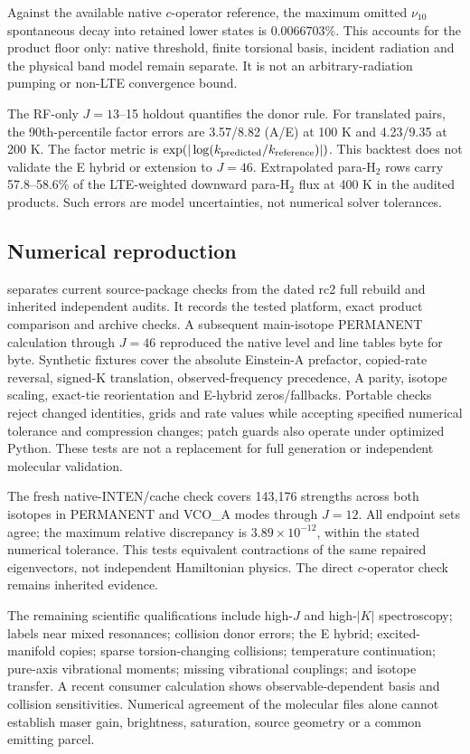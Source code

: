\documentclass[11pt,a4paper]{article}
\begin{document}
Against the available native $c$-operator reference, the maximum omitted
$\nu_{10}$ spontaneous decay into retained lower states is
$0.0066703\%$. This accounts for the product floor only: native threshold,
finite torsional basis, incident radiation and the physical band model remain
separate. It is not an arbitrary-radiation pumping or non-LTE convergence bound.

The RF-only $J=13$--15 holdout quantifies the donor rule. For translated
pairs, the 90th-percentile factor errors are 3.57/8.82 (A/E) at 100 K and
4.23/9.35 at 200 K. The factor metric is
$\exp(|\log(k_{\rm predicted}/k_{\rm reference})|)$.
This backtest does not validate the E hybrid or extension to $J=46$.
Extrapolated para-H$_2$ rows carry 57.8--58.6\% of the LTE-weighted downward
para-H$_2$ flux at 400 K in the audited products. Such errors are model
uncertainties, not numerical solver tolerances.

\subsection{Numerical reproduction}
 separates current source-package checks from
the dated rc2 full rebuild and inherited independent audits. It records the
tested platform, exact product comparison and archive checks. A subsequent
main-isotope PERMANENT calculation through $J=46$ reproduced the native
level and line tables byte for byte. Synthetic fixtures cover the absolute Einstein-A
prefactor, copied-rate reversal, signed-K translation, observed-frequency
precedence, A parity, isotope scaling, exact-tie reorientation and E-hybrid
zeros/fallbacks. Portable checks reject changed identities, grids and rate
values while accepting specified numerical tolerance and compression changes;
patch guards also operate under optimized Python. These tests are not a replacement
for full generation or independent molecular validation.

The fresh native-INTEN/cache check covers 143,176 strengths across both
isotopes in PERMANENT and VCO\_A modes through $J=12$. All endpoint sets
agree; the maximum relative discrepancy is $3.89\times10^{-12}$, within
the stated numerical tolerance. This tests equivalent contractions of the
same repaired eigenvectors, not independent Hamiltonian physics. The direct
$c$-operator check remains inherited evidence.

The remaining scientific qualifications include high-$J$ and high-$|K|$
spectroscopy; labels near mixed resonances; collision donor errors; the E
hybrid; excited-manifold copies; sparse torsion-changing collisions;
temperature continuation; pure-axis vibrational moments; missing vibrational
couplings; and isotope transfer. A recent consumer calculation shows
observable-dependent basis and collision sensitivities. Numerical agreement
of the molecular files alone cannot establish maser gain, brightness,
saturation, source geometry or a common emitting parcel.
\end{document}
